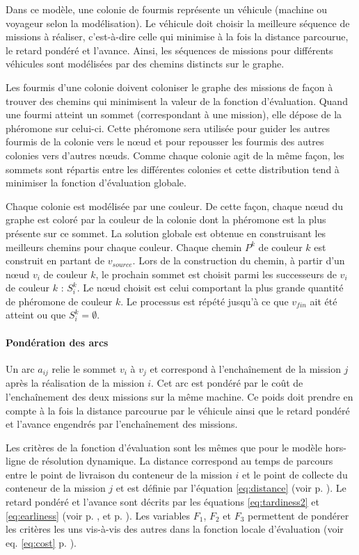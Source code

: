 Dans ce modèle, une colonie de fourmis représente un véhicule (machine ou voyageur selon la modélisation). Le véhicule doit choisir la meilleure séquence de missions à réaliser, c'est-à-dire celle qui minimise à la fois la distance parcourue, le retard pondéré et l'avance. Ainsi, les séquences de missions pour différents véhicules sont modélisées par des chemins distincts sur le graphe. 

Les fourmis d'une colonie doivent coloniser le graphe des missions de façon à trouver des chemins qui minimisent la valeur de la fonction d'évaluation.
Quand une fourmi atteint un sommet (correspondant à une mission), elle dépose de la phéromone sur celui-ci. Cette phéromone sera utilisée pour guider les autres fourmis de la colonie vers le n\oe{}ud et pour repousser les fourmis des autres colonies vers d'autres n\oe{}uds.
Comme chaque colonie agit de la même façon, les sommets sont répartis entre les différentes colonies et cette distribution tend à minimiser la fonction d'évaluation globale.

Chaque colonie est modélisée par une couleur. De cette façon, chaque n\oe{}ud du graphe est coloré par la couleur de la colonie dont la phéromone est la plus présente sur ce sommet. La solution globale est obtenue en construisant les meilleurs chemins pour chaque couleur. Chaque chemin $P^k$ de couleur $k$ est construit en partant de $v_{source}$. Lors de la construction du chemin, à partir d'un n\oe{}ud $v_i$ de couleur $k$, le prochain sommet est choisit parmi les successeurs de $v_i$ de couleur $k$ : $S^k_i$. Le n\oe{}ud choisit est celui comportant la plus grande quantité de phéromone de couleur $k$. Le processus est répété jusqu'à ce que $v_{fin}$ ait été atteint ou que $S^k_i=\emptyset$.

\paragraph{Pondération des arcs}

Un arc $a_{ij}$ relie le sommet $v_i$ à $v_j$ et correspond à l'enchaînement de la mission $j$ après la réalisation de la mission $i$. Cet arc est pondéré par le coût de l'enchaînement des deux missions sur la même machine. Ce poids doit prendre en compte à la fois la distance parcourue par le véhicule ainsi que le retard pondéré et l'avance engendrés par l'enchaînement des missions.

Les critères de la fonction d'évaluation sont les mêmes que pour le modèle hors-ligne de résolution dynamique. La distance correspond au temps de parcours entre le point de livraison du conteneur de la mission $i$ et le point de collecte du conteneur de la mission $j$ et est définie par l'équation \ref{eq:distance} (voir p. \pageref{eq:distance}). Le retard pondéré et l'avance sont décrits par les équations \ref{eq:tardiness2} et \ref{eq:earliness} (voir p. \pageref{eq:tardiness2}, et p. \pageref{eq:earliness}). Les variables $F_1$, $F_2$ et $F_3$ permettent de pondérer les critères les uns vis-à-vis des autres dans la fonction locale d'évaluation (voir eq. \ref{eq:cost} p. \pageref{eq:cost}).

